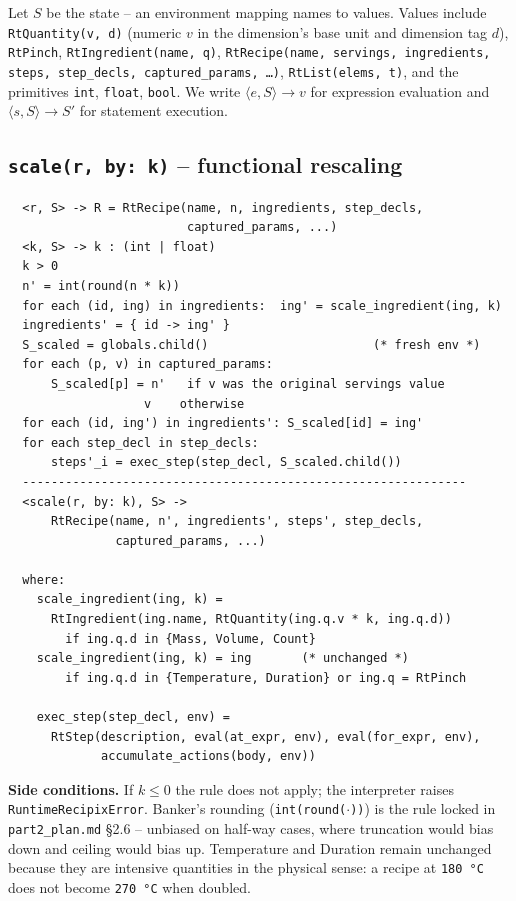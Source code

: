 \documentclass[11pt,a4paper]{article}
\begin{document}
Let $S$ be the state -- an environment mapping names to values. Values
include \texttt{RtQuantity(v, d)} (numeric $v$ in the dimension's base
unit and dimension tag $d$), \texttt{RtPinch}, \texttt{RtIngredient(name, q)},
\texttt{RtRecipe(name, servings, ingredients, steps, step\_decls,
captured\_params, \dots)}, \texttt{RtList(elems, t)}, and the primitives
\texttt{int}, \texttt{float}, \texttt{bool}. We write
$\langle e, S \rangle \to v$ for expression evaluation and
$\langle s, S \rangle \to S'$ for statement execution.

\subsection*{\texttt{scale(r, by: k)} -- functional rescaling}

\begin{lstlisting}
  <r, S> -> R = RtRecipe(name, n, ingredients, step_decls,
                         captured_params, ...)
  <k, S> -> k : (int | float)
  k > 0
  n' = int(round(n * k))
  for each (id, ing) in ingredients:  ing' = scale_ingredient(ing, k)
  ingredients' = { id -> ing' }
  S_scaled = globals.child()                       (* fresh env *)
  for each (p, v) in captured_params:
      S_scaled[p] = n'   if v was the original servings value
                   v    otherwise
  for each (id, ing') in ingredients': S_scaled[id] = ing'
  for each step_decl in step_decls:
      steps'_i = exec_step(step_decl, S_scaled.child())
  --------------------------------------------------------------
  <scale(r, by: k), S> ->
      RtRecipe(name, n', ingredients', steps', step_decls,
               captured_params, ...)

  where:
    scale_ingredient(ing, k) =
      RtIngredient(ing.name, RtQuantity(ing.q.v * k, ing.q.d))
        if ing.q.d in {Mass, Volume, Count}
    scale_ingredient(ing, k) = ing       (* unchanged *)
        if ing.q.d in {Temperature, Duration} or ing.q = RtPinch

    exec_step(step_decl, env) =
      RtStep(description, eval(at_expr, env), eval(for_expr, env),
             accumulate_actions(body, env))
\end{lstlisting}

\noindent\textbf{Side conditions.} If $k \leq 0$ the rule does not
apply; the interpreter raises \texttt{RuntimeRecipixError}. Banker's
rounding (\texttt{int(round($\cdot$))}) is the rule locked in
\texttt{part2\_plan.md} \S2.6 -- unbiased on half-way cases, where
truncation would bias down and ceiling would bias up. Temperature and
Duration remain unchanged because they are intensive quantities in the
physical sense: a recipe at \texttt{180~°C} does not become \texttt{270~°C}
when doubled.
\end{document}
